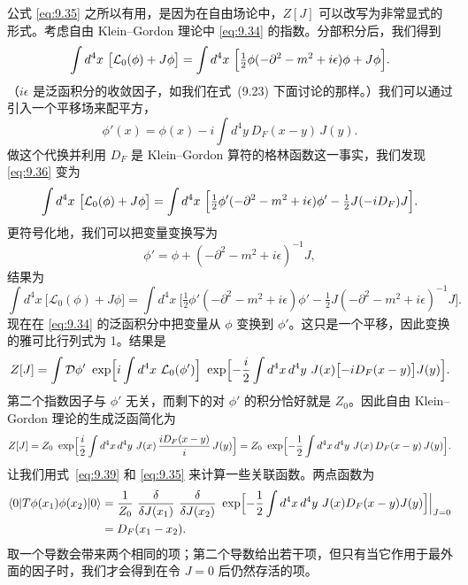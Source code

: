 公式 \eqref{eq:9.35} 之所以有用，是因为在自由场论中，$Z[J]$ 可以改写为非常显式的形式。考虑自由 Klein--Gordon 理论中 \eqref{eq:9.34} 的指数。分部积分后，我们得到
\begin{equation}
  \int d^4x\ \bigl[ \mathcal{L}_0(\phi) + J\phi \bigr]
  = \int d^4x\ \Bigl[ \tfrac{1}{2}\phi(-\partial^2-m^2+i\epsilon)\phi
    + J\phi \Bigr].
  \label{eq:9.36}
\end{equation}
（$i\epsilon$ 是泛函积分的收敛因子，如我们在式~(9.23) 下面讨论的那样。）我们可以通过引入一个平移场来配平方，
\begin{equation}
  \phi'(x) = \phi(x) - i\int d^4y\ D_F(x-y)\,J(y) .
\end{equation}
做这个代换并利用 $D_F$ 是 Klein--Gordon 算符的格林函数这一事实，我们发现 \eqref{eq:9.36} 变为
\begin{equation}
  \int d^4x\ \bigl[ \mathcal{L}_0(\phi)+J\phi \bigr]
  = \int d^4x\ \Bigl[ \tfrac{1}{2}\phi'(-\partial^2-m^2+i\epsilon)\phi'
    - \tfrac{1}{2}J(-iD_F)J \Bigr] .
\end{equation}
更符号化地，我们可以把变量变换写为
\begin{equation}
  \phi' = \phi + (-\partial^2-m^2+i\epsilon)^{-1}J,
  \label{eq:9.37}
\end{equation}
结果为
\begin{equation}
  \int d^4x\ \bigl[ \mathcal{L}_0(\phi)+J\phi \bigr]
  = \int d^4x\ \bigl[ \tfrac{1}{2}\phi'(-\partial^2-m^2+i\epsilon)\phi'
    - \tfrac{1}{2}J(-\partial^2-m^2+i\epsilon)^{-1}J \bigr].
  \label{eq:9.38}
\end{equation}
现在在 \eqref{eq:9.34} 的泛函积分中把变量从 $\phi$ 变换到 $\phi'$。这只是一个平移，因此变换的雅可比行列式为 1。结果是
\begin{equation}
  Z[J] = \int \mathcal{D}\phi'\ \exp\Bigl[ i\int d^4x\ \mathcal{L}_0(\phi')
    \Bigr]\ \exp\Bigl[ -\frac{i}{2}\int d^4x\,d^4y\ J(x)
      \bigl[ -iD_F(x-y) \bigr]J(y) \Bigr] .
\end{equation}
第二个指数因子与 $\phi'$ 无关，而剩下的对 $\phi'$ 的积分恰好就是 $Z_0$。因此自由 Klein--Gordon 理论的生成泛函简化为
\begin{equation}
  Z[J] = Z_0\ \exp\Bigl[ \frac{i}{2}\int d^4x\,d^4y\ J(x)\,
    \frac{iD_F(x-y)}{i}\,J(y) \Bigr]
  = Z_0\ \exp\Bigl[ -\frac{1}{2}\int d^4x\,d^4y\ J(x)\,D_F(x-y)\,J(y)
    \Bigr].
  \label{eq:9.39}
\end{equation}
让我们用式~\eqref{eq:9.39} 和 \eqref{eq:9.35} 来计算一些关联函数。两点函数为
\begin{equation}
  \begin{aligned}
    \langle 0|T\phi(x_1)\phi(x_2)|0\rangle
    &= \frac{1}{Z_0}\ \frac{\delta}{\delta J(x_1)}\ \frac{\delta}
      {\delta J(x_2)}\ \exp\Bigl[ -\frac{1}{2}\int d^4x\,d^4y\
        J(x)D_F(x-y)J(y) \Bigr]\Big|_{J=0}\\
    &= D_F(x_1-x_2) .
  \end{aligned}
  \label{eq:9.40}
\end{equation}
取一个导数会带来两个相同的项；第二个导数给出若干项，但只有当它作用于最外面的因子时，我们才会得到在令 $J=0$ 后仍然存活的项。


